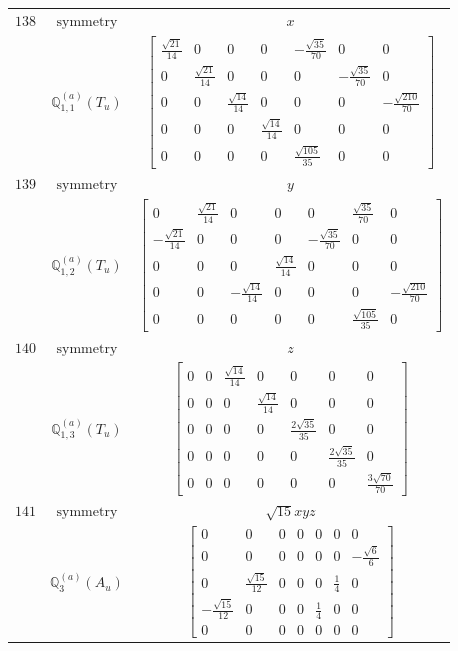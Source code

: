 \documentclass[fleqn,8pt,landscape]{jsarticle}
\begin{document}
\begin{longtable}{ccc}
$ 138 $ & $ \text{symmetry} $ & $ x $ \\
$  $ & $ \mathbb{Q}_{1,1}^{(a)}(T_{u}) $ & $ \begin{bmatrix} \frac{\sqrt{21}}{14} & 0 & 0 & 0 & - \frac{\sqrt{35}}{70} & 0 & 0 \\ 0 & \frac{\sqrt{21}}{14} & 0 & 0 & 0 & - \frac{\sqrt{35}}{70} & 0 \\ 0 & 0 & \frac{\sqrt{14}}{14} & 0 & 0 & 0 & - \frac{\sqrt{210}}{70} \\ 0 & 0 & 0 & \frac{\sqrt{14}}{14} & 0 & 0 & 0 \\ 0 & 0 & 0 & 0 & \frac{\sqrt{105}}{35} & 0 & 0 \end{bmatrix} $ \\ \hline
$ 139 $ & $ \text{symmetry} $ & $ y $ \\
$  $ & $ \mathbb{Q}_{1,2}^{(a)}(T_{u}) $ & $ \begin{bmatrix} 0 & \frac{\sqrt{21}}{14} & 0 & 0 & 0 & \frac{\sqrt{35}}{70} & 0 \\ - \frac{\sqrt{21}}{14} & 0 & 0 & 0 & - \frac{\sqrt{35}}{70} & 0 & 0 \\ 0 & 0 & 0 & \frac{\sqrt{14}}{14} & 0 & 0 & 0 \\ 0 & 0 & - \frac{\sqrt{14}}{14} & 0 & 0 & 0 & - \frac{\sqrt{210}}{70} \\ 0 & 0 & 0 & 0 & 0 & \frac{\sqrt{105}}{35} & 0 \end{bmatrix} $ \\ \hline
$ 140 $ & $ \text{symmetry} $ & $ z $ \\
$  $ & $ \mathbb{Q}_{1,3}^{(a)}(T_{u}) $ & $ \begin{bmatrix} 0 & 0 & \frac{\sqrt{14}}{14} & 0 & 0 & 0 & 0 \\ 0 & 0 & 0 & \frac{\sqrt{14}}{14} & 0 & 0 & 0 \\ 0 & 0 & 0 & 0 & \frac{2 \sqrt{35}}{35} & 0 & 0 \\ 0 & 0 & 0 & 0 & 0 & \frac{2 \sqrt{35}}{35} & 0 \\ 0 & 0 & 0 & 0 & 0 & 0 & \frac{3 \sqrt{70}}{70} \end{bmatrix} $ \\ \hline
$ 141 $ & $ \text{symmetry} $ & $ \sqrt{15} x y z $ \\
$  $ & $ \mathbb{Q}_{3}^{(a)}(A_{u}) $ & $ \begin{bmatrix} 0 & 0 & 0 & 0 & 0 & 0 & 0 \\ 0 & 0 & 0 & 0 & 0 & 0 & - \frac{\sqrt{6}}{6} \\ 0 & \frac{\sqrt{15}}{12} & 0 & 0 & 0 & \frac{1}{4} & 0 \\ - \frac{\sqrt{15}}{12} & 0 & 0 & 0 & \frac{1}{4} & 0 & 0 \\ 0 & 0 & 0 & 0 & 0 & 0 & 0 \end{bmatrix} $ \\ \hline

\end{longtable}
\end{document}
